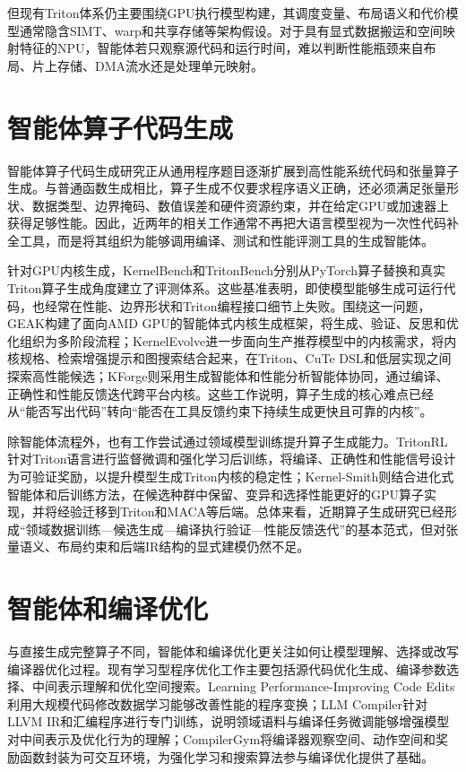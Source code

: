 但现有Triton体系仍主要围绕GPU执行模型构建，其调度变量、布局语义和代价模型通常隐含SIMT、warp和共享存储等架构假设。对于具有显式数据搬运和空间映射特征的NPU，智能体若只观察源代码和运行时间，难以判断性能瓶颈来自布局、片上存储、DMA流水还是处理单元映射。

\section{智能体算子代码生成}

智能体算子代码生成研究正从通用程序题目逐渐扩展到高性能系统代码和张量算子生成。与普通函数生成相比，算子生成不仅要求程序语义正确，还必须满足张量形状、数据类型、边界掩码、数值误差和硬件资源约束，并在给定GPU或加速器上获得足够性能。因此，近两年的相关工作通常不再把大语言模型视为一次性代码补全工具，而是将其组织为能够调用编译、测试和性能评测工具的生成智能体。

针对GPU内核生成，KernelBench和TritonBench分别从PyTorch算子替换和真实Triton算子生成角度建立了评测体系\citep{ouyang2025kernelbench,li2025tritonbench}。这些基准表明，即使模型能够生成可运行代码，也经常在性能、边界形状和Triton编程接口细节上失败。围绕这一问题，GEAK构建了面向AMD GPU的智能体式内核生成框架，将生成、验证、反思和优化组织为多阶段流程\citep{wang2025geak}；KernelEvolve进一步面向生产推荐模型中的内核需求，将内核规格、检索增强提示和图搜索结合起来，在Triton、CuTe DSL和低层实现之间探索高性能候选\citep{liao2025kernelevolve}；KForge则采用生成智能体和性能分析智能体协同，通过编译、正确性和性能反馈迭代跨平台内核\citep{sereda2026kforge}。这些工作说明，算子生成的核心难点已经从“能否写出代码”转向“能否在工具反馈约束下持续生成更快且可靠的内核”。

除智能体流程外，也有工作尝试通过领域模型训练提升算子生成能力。TritonRL针对Triton语言进行监督微调和强化学习后训练，将编译、正确性和性能信号设计为可验证奖励，以提升模型生成Triton内核的稳定性\citep{woo2025tritonrl}；Kernel-Smith则结合进化式智能体和后训练方法，在候选种群中保留、变异和选择性能更好的GPU算子实现，并将经验迁移到Triton和MACA等后端\citep{du2026kernelsmith}。总体来看，近期算子生成研究已经形成“领域数据训练—候选生成—编译执行验证—性能反馈迭代”的基本范式，但对张量语义、布局约束和后端IR结构的显式建模仍然不足。

\section{智能体和编译优化}

与直接生成完整算子不同，智能体和编译优化更关注如何让模型理解、选择或改写编译器优化过程。现有学习型程序优化工作主要包括源代码优化生成、编译参数选择、中间表示理解和优化空间搜索。Learning Performance-Improving Code Edits利用大规模代码修改数据学习能够改善性能的程序变换\citep{shypula2024learning}；LLM Compiler针对LLVM IR和汇编程序进行专门训练，说明领域语料与编译任务微调能够增强模型对中间表示及优化行为的理解\citep{cummins2025llmcompiler}；CompilerGym将编译器观察空间、动作空间和奖励函数封装为可交互环境，为强化学习和搜索算法参与编译优化提供了基础\citep{cummins2022compilergym}。

